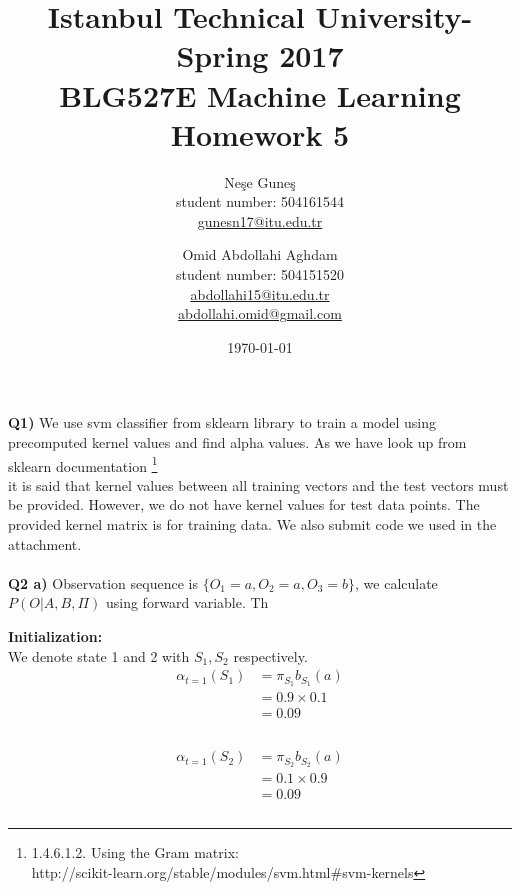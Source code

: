 \documentclass[12pt]{article}
\begin{document}
\title{Istanbul Technical University- Spring 2017 \\ BLG527E Machine Learning \\ Homework 5}
\author{Ne\c{s}e Gune\c{s} \\ student number: 504161544 \\ 
	\href{mailto:gunesn17@itu.edu.tr}{gunesn17@itu.edu.tr} \and Omid Abdollahi Aghdam \\
student number: 504151520\\
\href{mailto:abdollahi15@itu.edu.tr}{abdollahi15@itu.edu.tr}\\
\href{mailto:abdollahi.omid@gmail.com}{abdollahi.omid@gmail.com}
}
\date{\today}
\maketitle
\newpage

\textbf{Q1)} We use svm classifier from sklearn library to train a model using precomputed kernel values and find alpha values. As we have look up from sklearn documentation \footnote{1.4.6.1.2. Using the Gram matrix: \\ http://scikit-learn.org/stable/modules/svm.html\#svm-kernels} \\ it is said that kernel values between all training vectors and the test vectors must be provided. However, we do not have kernel values for test data points. The provided kernel matrix  is for training data. We also submit code we used in the attachment.\\ \\
\textbf{Q2 a)} Observation sequence is $\{O_1 = a, O_2=a, O_3=b\}$, we calculate $P(O | A, B, \Pi)$ using forward variable. Th

\textbf{Initialization:}\\
We denote state 1 and 2 with $S_1, S_2$ respectively.
\begin{equation}
	\begin{aligned}
		\alpha_{t=1}(S_1) &= \pi_{S_1}b_{S_1}(a)\\
						&= 0.9 \times 0.1\\
						&=0.09 \\ \\
	\end{aligned}
\end{equation}

\begin{equation}
	\begin{aligned}
		\alpha_{t=1}(S_2) &= \pi_{S_2}b_{S_2}(a)\\
		&= 0.1 \times 0.9\\
		&=0.09 \\ \\
	\end{aligned}
\end{equation}
\end{document}
